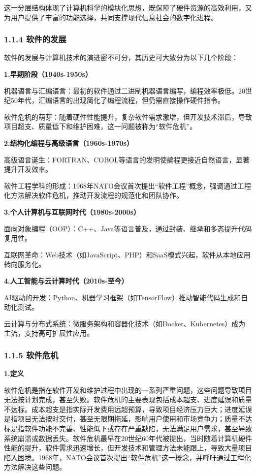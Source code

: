 \documentclass[12pt,a4paper]{article}
\begin{document}
这一分层结构体现了计算机科学的模块化思想，既保障了硬件资源的高效利用，又为用户提供了丰富的功能选择，共同支撑现代信息社会的数字化进程。

\subsubsection{1.1.4 软件的发展}\label{ux8f6fux4ef6ux7684ux53d1ux5c55}

软件的发展与计算机技术的演进密不可分，其历史可大致分为以下几个阶段：

\textbf{1.早期阶段（1940s-1950s）}

机器语言与汇编语言：最初的软件通过二进制机器语言编写，编程效率极低。20世纪50年代，汇编语言的出现简化了编程流程，但仍需直接操作硬件指令。

软件危机的萌芽：随着硬件性能提升，复杂软件需求激增，但开发技术滞后，导致项目超支、质量低下和维护困难，这一问题被称为``软件危机''。

\textbf{2.结构化编程与高级语言（1960s-1970s）}

高级语言诞生：FORTRAN、COBOL等语言的发明使编程更接近自然语言，显著提升开发效率。

软件工程学科的形成：1968年NATO会议首次提出``软件工程''概念，强调通过工程化方法解决软件危机，推动开发流程的规范化和团队协作。

\textbf{3.个人计算机与互联网时代（1980s-2000s）}

面向对象编程（OOP）：C++、Java等语言普及，通过封装、继承和多态提升代码复用性。

互联网革命：Web技术（如JavaScript、PHP）和SaaS模式兴起，软件从本地应用转向服务化。

\textbf{4.人工智能与云计算时代（2010s-至今）}

AI驱动的开发：Python、机器学习框架（如TensorFlow）推动智能代码生成和自动化测试。

云计算与分布式系统：微服务架构和容器化技术（如Docker、Kubernetes）成为主流，支持高可扩展性应用。

\subsubsection{1.1.5 软件危机}\label{ux8f6fux4ef6ux5371ux673a}

\textbf{1.定义}

软件危机是指在软件开发和维护过程中出现的一系列严重问题，这些问题导致项目无法按计划完成，甚至失败。软件危机的主要表现包括成本超支、进度延误和质量不达标。成本超支是指实际开发费用远超预算，导致项目经济压力巨大；进度延误是指项目无法按时交付，甚至无限期拖延，影响用户使用和市场竞争力；质量不达标是指软件功能不完善、性能低下或存在严重缺陷，无法满足用户需求，甚至导致系统崩溃或数据丢失。软件危机最早在20世纪60年代被提出，当时随着计算机硬件性能的提升，软件需求迅速增长，但开发技术和管理方法未能跟上，导致大量项目陷入困境。1968年，NATO会议首次提出``软件危机''这一概念，并呼吁通过工程化方法解决这些问题。
\end{document}
